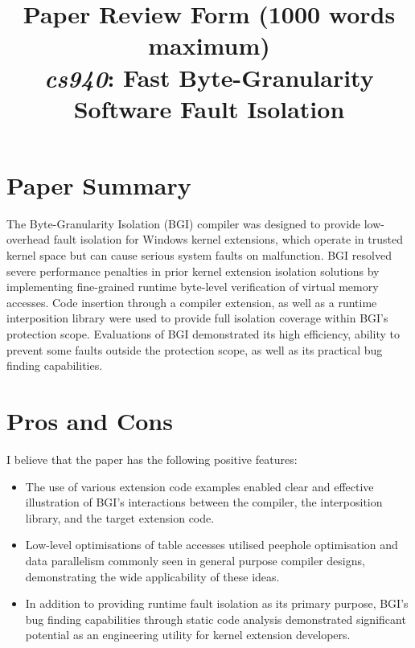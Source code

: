 \documentclass[11pt]{article}
\begin{document}
\title{Paper Review Form (1000 words maximum)\\
  \emph{cs940}: Fast Byte-Granularity Software Fault Isolation \cite{castro2009fast}}
\maketitle

\section*{Paper Summary}

The Byte-Granularity Isolation (BGI) compiler was designed to provide low-overhead fault isolation for Windows kernel extensions, which operate in trusted kernel space but can cause serious system faults on malfunction. BGI resolved severe performance penalties in prior kernel extension isolation solutions by implementing fine-grained runtime byte-level verification of virtual memory accesses. Code insertion through a compiler extension, as well as a runtime interposition library were used to provide full isolation coverage within BGI's protection scope. Evaluations of BGI demonstrated its high efficiency, ability to prevent some faults outside the protection scope, as well as its practical bug finding capabilities.

\section*{Pros and Cons}

I believe that the paper has the following positive features:
\begin{itemize}
	\item The use of various extension code examples enabled clear and effective illustration of BGI's interactions between the compiler, the interposition library, and the target extension code.
	\item Low-level optimisations of table accesses utilised peephole optimisation and data parallelism commonly seen in general purpose compiler designs, demonstrating the wide applicability of these ideas.
	\item In addition to providing runtime fault isolation as its primary purpose, BGI's bug finding capabilities through static code analysis demonstrated significant potential as an engineering utility for kernel extension developers.
\end{itemize}
\end{document}
